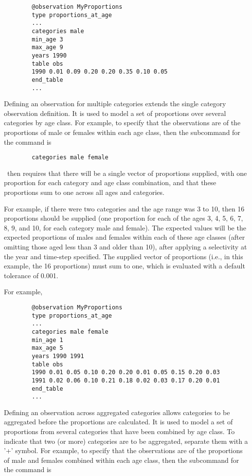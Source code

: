 {\small{\begin{verbatim}
		@observation MyProportions
		type proportions_at_age
		...
		categories male
		min_age 3
		max_age 9
		years 1990
		table obs
		1990 0.01 0.09 0.20 0.20 0.35 0.10 0.05
		end_table
		...
		\end{verbatim}}}

Defining an observation for multiple categories extends the single category observation definition. It is used to model a set of proportions over several categories by age class. For example, to specify that the observations are of the proportions of male or females within each age class, then the subcommand  for the  command is

{\small{\begin{verbatim}
		categories male female
		\end{verbatim}}}

\CNAME\ then requires that there will be a single vector of proportions supplied, with one proportion for each category and age class combination, and that these proportions sum to one across all ages and categories.

For example, if there were two categories and the age range was 3 to 10, then 16 proportions should be supplied (one proportion for each of the ages 3, 4, 5, 6, 7, 8, 9, and 10, for each category male and female). The expected values will be the expected proportions of males and females within each of these age classes (after omitting those aged less than 3 and older than 10), after applying a selectivity at the year and time-step specified. The supplied vector of proportions (i.e., in this example, the 16 proportions) must sum to one, which is evaluated with a default tolerance of 0.001.

For example,

{\small{\begin{verbatim}
		@observation MyProportions
		type proportions_at_age
		...
		categories male female
		min_age 1
		max_age 5
		years 1990 1991
		table obs
		1990 0.01 0.05 0.10 0.20 0.20 0.01 0.05 0.15 0.20 0.03
		1991 0.02 0.06 0.10 0.21 0.18 0.02 0.03 0.17 0.20 0.01
		end_table
		...
		\end{verbatim}}}

Defining an observation across aggregated categories allows categories to be aggregated before the proportions are calculated. It is used to model a set of proportions from several categories that have been combined by age class. To indicate that two (or more) categories are to be aggregated, separate them with a '+' symbol. For example, to specify that the observations are of the proportions of male and females combined within each age class, then the subcommand  for the  command is

